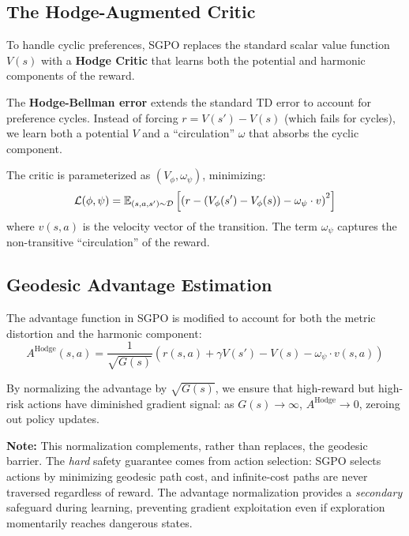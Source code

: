 \subsection{The Hodge-Augmented Critic}

To handle cyclic preferences, SGPO replaces the standard scalar value function $V(s)$ with a \textbf{Hodge Critic} that learns both the potential and harmonic components of the reward.

The \textbf{Hodge-Bellman error} extends the standard TD error to account for preference cycles. Instead of forcing $r = V(s') - V(s)$ (which fails for cycles), we learn both a potential $V$ and a ``circulation'' $\omega$ that absorbs the cyclic component.

The critic is parameterized as $(V_\phi, \omega_\psi)$, minimizing:
\begin{equation}
\small
\mathcal{L}(\phi, \psi) = \mathbb{E}_{(s,a,s') \sim \mathcal{D}} \left[ \left( r - (V_\phi(s') - V_\phi(s)) - \omega_\psi \cdot v \right)^2 \right]
\end{equation}
where $v(s,a)$ is the velocity vector of the transition. The term $\omega_\psi$ captures the non-transitive ``circulation'' of the reward.

\subsection{Geodesic Advantage Estimation}

The advantage function in SGPO is modified to account for both the metric distortion and the harmonic component:
\begin{equation}
A^{\text{Hodge}}(s,a) = \frac{1}{\sqrt{G(s)}} \left( r(s,a) + \gamma V(s') - V(s) - \omega_\psi \cdot v(s,a) \right)
\end{equation}

By normalizing the advantage by $\sqrt{G(s)}$, we ensure that high-reward but high-risk actions have diminished gradient signal: as $G(s) \to \infty$, $A^{\text{Hodge}} \to 0$, zeroing out policy updates. 

\textbf{Note:} This normalization complements, rather than replaces, the geodesic barrier. The \emph{hard} safety guarantee comes from action selection: SGPO selects actions by minimizing geodesic path cost, and infinite-cost paths are never traversed regardless of reward. The advantage normalization provides a \emph{secondary} safeguard during learning, preventing gradient exploitation even if exploration momentarily reaches dangerous states.

